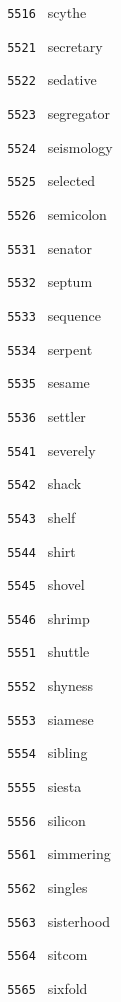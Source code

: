 \documentclass[11pt]{article}
\begin{document}
\begin{multicols}{6}
\noindent \texttt{ 5516 } scythe  \par
\vspace{3mm}
\noindent \texttt{ 5521 } secretary  \par
\noindent \texttt{ 5522 } sedative  \par
\noindent \texttt{ 5523 } segregator  \par
\noindent \texttt{ 5524 } seismology  \par
\noindent \texttt{ 5525 } selected  \par
\noindent \texttt{ 5526 } semicolon  \par
\vspace{3mm}
\noindent \texttt{ 5531 } senator  \par
\noindent \texttt{ 5532 } septum  \par
\noindent \texttt{ 5533 } sequence  \par
\noindent \texttt{ 5534 } serpent  \par
\noindent \texttt{ 5535 } sesame  \par
\noindent \texttt{ 5536 } settler  \par
\vspace{3mm}
\noindent \texttt{ 5541 } severely  \par
\noindent \texttt{ 5542 } shack  \par
\noindent \texttt{ 5543 } shelf  \par
\noindent \texttt{ 5544 } shirt  \par
\noindent \texttt{ 5545 } shovel  \par
\noindent \texttt{ 5546 } shrimp  \par
\vspace{3mm}
\noindent \texttt{ 5551 } shuttle  \par
\noindent \texttt{ 5552 } shyness  \par
\noindent \texttt{ 5553 } siamese  \par
\noindent \texttt{ 5554 } sibling  \par
\noindent \texttt{ 5555 } siesta  \par
\noindent \texttt{ 5556 } silicon  \par
\vspace{3mm}
\noindent \texttt{ 5561 } simmering  \par
\noindent \texttt{ 5562 } singles  \par
\noindent \texttt{ 5563 } sisterhood  \par
\noindent \texttt{ 5564 } sitcom  \par
\noindent \texttt{ 5565 } sixfold  \par

\end{multicols}
\end{document}
